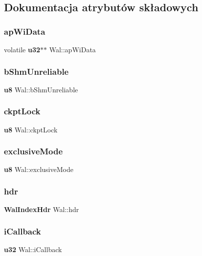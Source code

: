 \subsection{Dokumentacja atrybutów składowych}
\mbox{\label{struct_wal_a2b0078e3adfd1fb21794561bb12bbfac}} 
\subsubsection{apWiData}
{\footnotesize\ttfamily volatile \textbf{ u32}$\ast$$\ast$ Wal\+::ap\+Wi\+Data}

\mbox{\label{struct_wal_a5f2961175582eb8c832263b88ca1ec55}} 
\subsubsection{bShmUnreliable}
{\footnotesize\ttfamily \textbf{ u8} Wal\+::b\+Shm\+Unreliable}

\mbox{\label{struct_wal_a29153bfb37a9a32f1171e5c1d10994d2}} 
\subsubsection{ckptLock}
{\footnotesize\ttfamily \textbf{ u8} Wal\+::ckpt\+Lock}

\mbox{\label{struct_wal_ada255c96ca65d9d8955bbf139af4e6f4}} 
\subsubsection{exclusiveMode}
{\footnotesize\ttfamily \textbf{ u8} Wal\+::exclusive\+Mode}

\mbox{\label{struct_wal_adbeef9e632541fbf07c926652b165906}} 
\subsubsection{hdr}
{\footnotesize\ttfamily \textbf{ Wal\+Index\+Hdr} Wal\+::hdr}

\mbox{\label{struct_wal_aae230a2317817739a5f08ebb28b644b0}} 
\subsubsection{iCallback}
{\footnotesize\ttfamily \textbf{ u32} Wal\+::i\+Callback}

